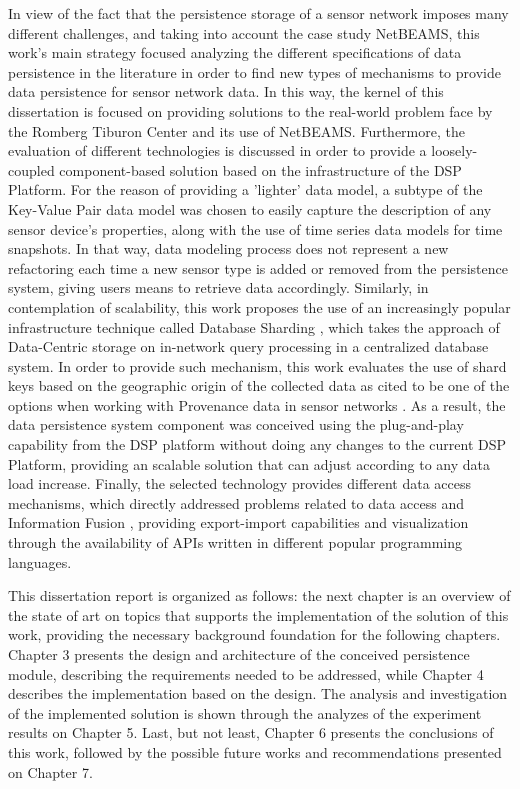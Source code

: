 In view of the fact that the persistence storage of a sensor network imposes
many different challenges, and taking into account the case study NetBEAMS, this
work's main strategy focused analyzing the different specifications of data
persistence in the literature in order to find new types of mechanisms to
provide data persistence for sensor network data. In this way, the kernel of
this dissertation is focused on providing solutions to the real-world problem
face by the Romberg Tiburon Center and its use of NetBEAMS. Furthermore,
the evaluation of different technologies is discussed in order to provide a
loosely-coupled component-based solution based on the infrastructure of the 
DSP Platform. For the reason of providing a 'lighter' data model, a subtype of
the Key-Value Pair \cite{kvp01} data model was chosen to easily capture the
description of any sensor device's properties, along with the use of time
series data models \cite{sn-provenance01} for time snapshots. In that way, data
modeling process does not represent a new refactoring each time a new sensor 
type is added or removed from the persistence system, giving users means to 
retrieve data accordingly. Similarly, in contemplation of scalability, this 
work proposes the use of an increasingly popular infrastructure technique called
Database Sharding \cite{dbshard01} \cite{dbshard02}, which takes the approach of
Data-Centric storage \cite{sn-storage03} on in-network query processing in a
centralized database system. In order to provide such mechanism, this work
evaluates the use of shard keys based on the geographic origin of the collected
data as cited to be one of the options when working with Provenance data in 
sensor networks \cite{sn-provenance01}. As a result, the data persistence system
component was conceived using the plug-and-play capability from the DSP 
platform without doing  any changes to the current DSP Platform, providing an
scalable solution that can adjust according to any data load increase. Finally,
the selected technology provides different data access mechanisms, which
directly addressed problems related to data access and Information Fusion 
\cite{sndp06}, providing export-import capabilities and visualization through
the availability of APIs written in different popular programming languages.

This dissertation report is organized as follows: the next chapter is an 
overview of the state of art on topics that supports the implementation of the
solution of this work, providing the necessary background foundation for the 
following chapters. Chapter 3 presents the design and architecture of the 
conceived persistence module, describing the requirements needed to be
addressed,  while Chapter 4 describes the implementation based on the design. 
The analysis and investigation of the implemented solution is shown through 
the analyzes of the experiment results on Chapter 5. Last, but not least, 
Chapter 6 presents the conclusions of this work, followed by the possible 
future works and recommendations presented on Chapter 7.